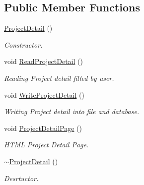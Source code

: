 \subsection*{Public Member Functions}
\begin{DoxyCompactItemize}
\item 
\hypertarget{classProjectDetail_a405e8bbc157e30c4ff93871988218d9f}{\hyperlink{classProjectDetail_a405e8bbc157e30c4ff93871988218d9f}{Project\-Detail} ()}\label{classProjectDetail_a405e8bbc157e30c4ff93871988218d9f}

\begin{DoxyCompactList}\small\item\em Constructor. \end{DoxyCompactList}\item 
\hypertarget{classProjectDetail_adb90a2d734932eaa299887f2a0f7a4f0}{void \hyperlink{classProjectDetail_adb90a2d734932eaa299887f2a0f7a4f0}{Read\-Project\-Detail} ()}\label{classProjectDetail_adb90a2d734932eaa299887f2a0f7a4f0}

\begin{DoxyCompactList}\small\item\em Reading Project detail filled by user. \end{DoxyCompactList}\item 
\hypertarget{classProjectDetail_aead21e43d205260a59c75fbc5c75f14b}{void \hyperlink{classProjectDetail_aead21e43d205260a59c75fbc5c75f14b}{Write\-Project\-Detail} ()}\label{classProjectDetail_aead21e43d205260a59c75fbc5c75f14b}

\begin{DoxyCompactList}\small\item\em Writing Project detail into file and database. \end{DoxyCompactList}\item 
\hypertarget{classProjectDetail_ade1395ab7aed2603464d81c3c352e716}{void \hyperlink{classProjectDetail_ade1395ab7aed2603464d81c3c352e716}{Project\-Detail\-Page} ()}\label{classProjectDetail_ade1395ab7aed2603464d81c3c352e716}

\begin{DoxyCompactList}\small\item\em H\-T\-M\-L Project Detail Page. \end{DoxyCompactList}\item 
\hypertarget{classProjectDetail_ab4719d14d9efb8811916f5d691099c8f}{\hyperlink{classProjectDetail_ab4719d14d9efb8811916f5d691099c8f}{$\sim$\-Project\-Detail} ()}\label{classProjectDetail_ab4719d14d9efb8811916f5d691099c8f}

\begin{DoxyCompactList}\small\item\em Desrtuctor. \end{DoxyCompactList}\end{DoxyCompactItemize}
